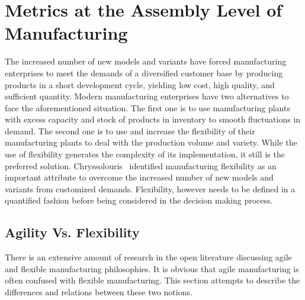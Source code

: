 \section{Metrics at the Assembly Level of Manufacturing}
The increased number of new models and variants have forced manufacturing enterprises to meet the demands of a diversified customer base by producing products in a short development cycle, yielding low cost, high quality, and sufficient quantity. Modern manufacturing enterprises have two alternatives to face the aforementioned situation. The first one is to use manufacturing plants with excess capacity and stock of products in inventory to smooth fluctuations in demand. The second one is to use and increase the flexibility of their manufacturing plants to deal with the production volume and variety. While the use of flexibility generates the complexity of its implementation, it still is the preferred solution. Chryssolouris~\cite{Chryssolouris.2005} identified manufacturing flexibility as an important attribute to overcome the increased number of new models and variants from customized demands. Flexibility, however needs to be defined in a quantified fashion before being considered in the decision making process.
%
%
\subsection{Agility Vs. Flexibility}
There is an extensive amount of research in the open literature discussing agile and flexible manufacturing philosophies. It is obvious that agile manufacturing is often confused with flexible manufacturing. This section attempts to describe the differences and relations between these two notions.

